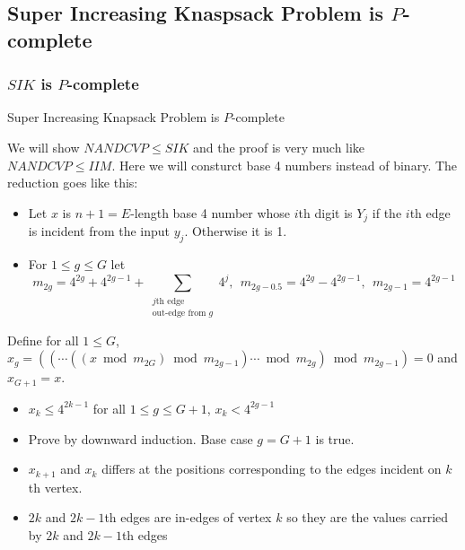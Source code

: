\documentclass[article,8pt]{beamer}%
\begin{document}
\subsection{Super Increasing Knaspsack Problem is $P$-complete}
\begin{frame}[allowframebreaks]
\frametitle{$SIK$ is $P$-complete}
\begin{theorem}
	Super Increasing Knapsack Problem is $P$-complete
\end{theorem}
We will show $NANDCVP\leq SIK$ and the proof is very much like $NANDCVP \leq IIM$. Here we will consturct base 4 numbers instead of binary. The reduction goes like this:\begin{itemize}
	\item Let $x$ is $n+1=E$-length base 4 number whose $i$th digit is $Y_j$ if the $i$th edge is incident from the input $y_j$. Otherwise it is 1.
	\item For $1\leq g\leq G$ let $$m_{2g}=4^{2g}+4^{2g-1}+\sum_{\substack{j\text{th edge}\\ \text{out-edge from }g}}4^j,\ \ m_{2g-0.5}=4^{2g}-4^{2g-1},\ \ m_{2g-1}=4^{2g-1}$$
\end{itemize}
Define for all $1\leq G$, $x_g=((\cdots ((x\bmod{m_{2G}})\bmod{m_{2g-1}})\cdots\bmod{m_{2g}})\bmod{m_{2g-1}})=0$ and $x_{G+1}=x$.
\begin{itemize}
	\item $x_k\leq 4^{2k-1}$ for all $1\leq g \leq G+1$, $x_k< 4^{2g-1}$
\end{itemize}
\framebreak

\begin{itemize}
	\begin{theorem}
		For all $1\leq g\leq G+1$, $0\leq j\leq 2g-1$ if the $j$th edge is an outgoing edge from an input node or from a gate $h$ such that $h\geq g$ then $x_g$'s $j$th bit is the value carried by $j$th edge 		otherwise 1
	\end{theorem}
	\vspace{5mm}
	
	\item Prove by downward induction. Base case $g=G+1$ is true.
	\item $x_{k+1}$ and $x_k$ differs at the positions corresponding to the edges incident on $k$th vertex.
	\item $2k$ and $2k-1$th edges are in-edges of vertex $k$ so they are the values carried by $2k$ and $2k-1$th edges
	
	\end{itemize}
\framebreak


\end{frame}
\end{document}
